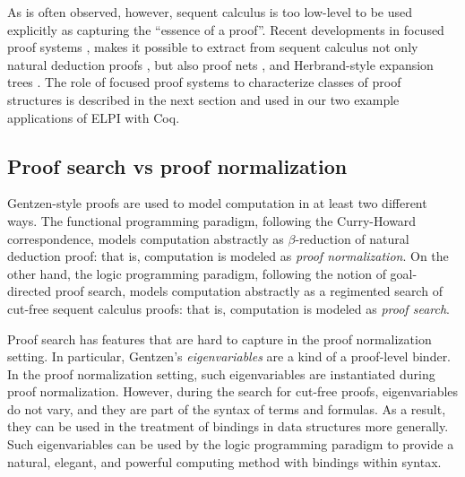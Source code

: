 
As is often observed, however, sequent calculus is too low-level to be
used explicitly as capturing the ``essence of a proof''.  Recent
developments in focused proof systems \cite{andreoli92jlc,liang09tcs},
makes it possible to extract from sequent calculus not only natural
deduction proofs \cite{pimentel16lsfa}, but also proof nets
\cite{chaudhuri08tcs}, and Herbrand-style expansion trees
\cite{chaudhuri16jlc}.  The role of focused proof systems to
characterize classes of proof structures is described in the next
section and used in our two example applications of ELPI with Coq.



\subsection{Proof search vs proof normalization}

Gentzen-style proofs are used to model computation in at least two
different ways.  The functional programming paradigm, following the
Curry-Howard correspondence, models computation abstractly as 
$\beta$-reduction of natural deduction proof: that is, computation is
modeled as \emph{proof normalization}.  On the other hand, the
logic programming paradigm, following the notion of goal-directed
proof search, models computation abstractly as a regimented search of
cut-free sequent calculus proofs: that is, computation is modeled
as \emph{proof search}.

Proof search has features that are hard to capture in the proof
normalization setting.  In particular, Gentzen's \emph{eigenvariables}
are a kind of a proof-level binder.  In the proof normalization
setting, such eigenvariables are instantiated during proof
normalization.  However, during the search for cut-free proofs,
eigenvariables do not vary, and they are part of the syntax of terms
and formulas.  As a result, they can be used in the treatment of
bindings in data structures more generally.  Such eigenvariables can
be used by the logic programming paradigm to provide a natural,
elegant, and powerful computing method with bindings within syntax.

